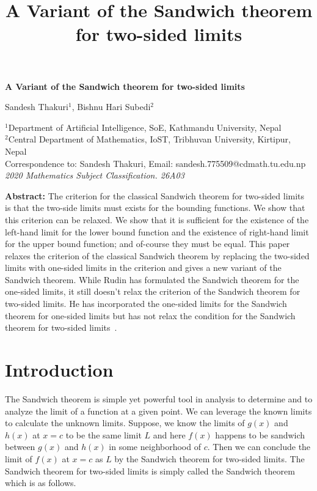 \documentclass[a4paper,twoside,12pt]{article}
\title{\bfseries A Variant of the Sandwich theorem for two-sided limits}
\theoremstyle{plain}
\theoremstyle{definition}
\begin{document}
\linenumbers
\vspace{2mm}
{\Large
\begin{center}
\bf{\LARGE \bfseries A Variant of the Sandwich theorem for two-sided limits}
\end{center}}
\begin{center}
Sandesh Thakuri$^{1}$, Bishnu Hari Subedi$^{2}$
\end{center}

\begin{center}
{\footnotesize
  $^{1}$Department of Artificial Intelligence, SoE, Kathmandu University, Nepal \\[1mm]
 \(^{2}\)Central Department of Mathematics, IoST, Tribhuvan University, Kirtipur, Nepal \\[2mm]
 Correspondence to: Sandesh Thakuri, Email: sandesh.775509@cdmath.tu.edu.np \\[1mm]
\textit{2020 Mathematics Subject Classification. 26A03}
}
\end{center}

\vspace{5mm}
\noindent
\textbf{Abstract:} {The criterion for the classical Sandwich theorem for two-sided limits is that the two-side limits must exists for the bounding functions. We show that this criterion can be relaxed. We show that it is sufficient for the existence of the left-hand limit for the lower bound function and the existence of right-hand limit for the upper bound function; and of-course they must be equal. This paper relaxes the criterion of the classical Sandwich theorem by replacing the two-sided limits with one-sided limits in the criterion and gives a new variant of the Sandwich theorem. While Rudin has formulated the Sandwich theorem for the one-sided limits, it still doesn't relax the criterion of the Sandwich theorem for two-sided limits. He has incorporated the one-sided limits for the Sandwich theorem for one-sided limits but has not relax the condition for the Sandwich theorem for two-sided limits~\cite{rudin}.}
\section{Introduction}
The Sandwich theorem is simple yet powerful tool in analysis to determine and to analyze the limit of a function at a given point. We can leverage the known limits to calculate the unknown limits. Suppose, we know the limits of \(g(x)\) and \(h(x)\) at \(x=c\) to be the same limit \(L\) and here \(f(x)\) happens to be sandwich between \(g(x)\) and \(h(x)\) in some neighborhood of \(c\). Then we can conclude the limit of \(f(x)\) at \(x=c\) as \(L\) by the Sandwich theorem for two-sided limits. The Sandwich theorem for two-sided limits is simply called the Sandwich theorem which is as follows.
\end{document}

